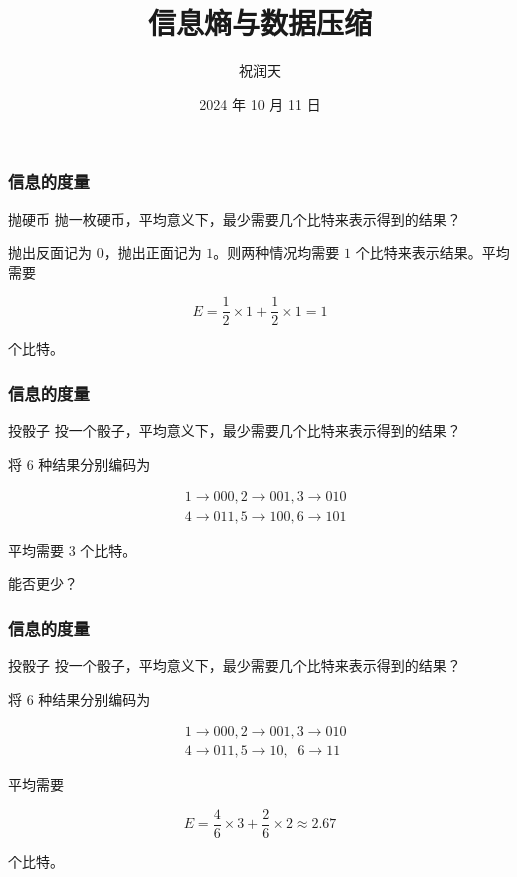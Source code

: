 \documentclass{beamer}
\title{信息熵与数据压缩}
\author{祝润天}
\institute{复旦大学计算机科学技术学院}
\date{2024 年 10 月 11 日}
\begin{document}
\begin{frame}
    
    \maketitle

\end{frame}

\begin{frame}
    \frametitle{信息的度量}

    \begin{block}{抛硬币}
        抛一枚硬币，平均意义下，最少需要几个比特来表示得到的结果？
    \end{block}

    抛出反面记为 $0$，抛出正面记为 $1$。则两种情况均需要 $1$ 个比特来表示结果。平均需要

    \[E = \frac{1}{2}\times 1 + \frac{1}{2}\times 1 = 1\]

    个比特。

\end{frame}

\begin{frame}
    \frametitle{信息的度量}

    \begin{block}{投骰子}
        投一个骰子，平均意义下，最少需要几个比特来表示得到的结果？
    \end{block}
    
    将 $6$ 种结果分别编码为

    \[\begin{split}
        & 1 \rightarrow 000, 2 \rightarrow 001, 3 \rightarrow 010 \\
        & 4 \rightarrow 011, 5 \rightarrow 100, 6 \rightarrow 101
    \end{split}\]

    平均需要 $3$ 个比特。

    能否更少？

\end{frame}

\begin{frame}
    \frametitle{信息的度量}

    \begin{block}{投骰子}
        投一个骰子，平均意义下，最少需要几个比特来表示得到的结果？
    \end{block}
    
    将 $6$ 种结果分别编码为

    \[\begin{split}
        & 1 \rightarrow 000, 2 \rightarrow 001, 3 \rightarrow 010 \\
        & 4 \rightarrow 011, 5 \rightarrow 10, \;\; 6 \rightarrow 11
    \end{split}\]

    平均需要

    \[E = \frac{4}{6}\times 3 + \frac{2}{6}\times 2 \approx 2.67\]
    
    个比特。

\end{frame}
\end{document}
